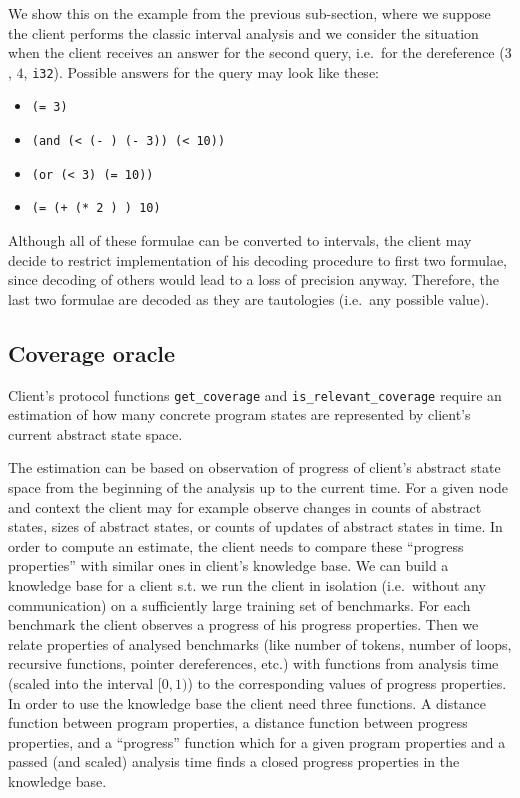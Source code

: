 \documentclass[envcountsame]{llncs}
\newcommand{\tmbraw}[3]{(\ensuremath{#1}, \ensuremath{#2}, \texttt{#3})}
\newcommand{\tmb}[3]{\tmbraw{#1}{#2}{#3}}
\begin{document}
We show this on the example from the previous sub-section, where we suppose the
client performs the classic interval analysis and we consider the situation when
the client receives an answer for the second query, i.e.~for the dereference
\tmb{3}{4}{i32}. Possible answers for the query may look like these:
\begin{itemize}
\item \texttt{(=  3)}
\item \texttt{(and (< (- ) (- 3)) (<  10))}
\item \texttt{(or (<  3) (=  10))}
\item \texttt{(= (+ (* 2 ) ) 10)}
\end{itemize}
Although all of these formulae can be converted to intervals, the client may
decide to restrict implementation of his decoding procedure to first two
formulae, since decoding of others would lead to a loss of precision anyway.
Therefore, the last two formulae are decoded as they are tautologies (i.e.~any
possible value).


\subsection{Coverage oracle}
\label{sec:CoverageOracle}

Client's protocol functions \texttt{get\_coverage} and
\texttt{is\_relevant\_coverage} require an estimation of how many concrete
program states are represented by client's current abstract state space.

The estimation can be based on observation of progress of client's abstract
state space from the beginning of the analysis up to the current time. For a
given node and context the client may for example observe changes in counts of
abstract states, sizes of abstract states, or counts of updates of abstract
states in time. In order to compute an estimate, the client needs to
compare these ``progress properties'' with similar ones in client's knowledge
base. We can build a knowledge base for a client s.t. we run the client in
isolation (i.e.~without any communication) on a sufficiently large training set
of benchmarks. For each benchmark the client observes a progress of his progress
properties. Then we relate properties of analysed benchmarks (like number of
tokens, number of loops, recursive functions, pointer dereferences, etc.) with
functions from analysis time (scaled into the interval $ [0,1) $) to the
corresponding values of progress properties. In order to use the knowledge base
the client need three functions. A distance function between program properties,
a distance function between progress properties, and a ``progress'' function
which for a given program properties and a passed (and scaled) analysis time
finds a closed progress properties in the knowledge base.
\end{document}
